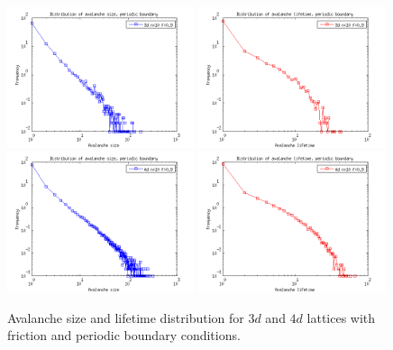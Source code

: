 \begin{figure} 
\begin{center}
\includegraphics[width=0.49\textwidth]{results/3spf.png}
\includegraphics[width=0.49\textwidth]{results/3tpf.png} \\
\includegraphics[width=0.49\textwidth]{results/4spf.png}
\includegraphics[width=0.49\textwidth]{results/4tpf.png} 
\caption{Avalanche size and lifetime distribution for $3d$ and $4d$ lattices with friction and periodic boundary conditions. }
\label{dspf}
\end{center}
\end{figure}  


